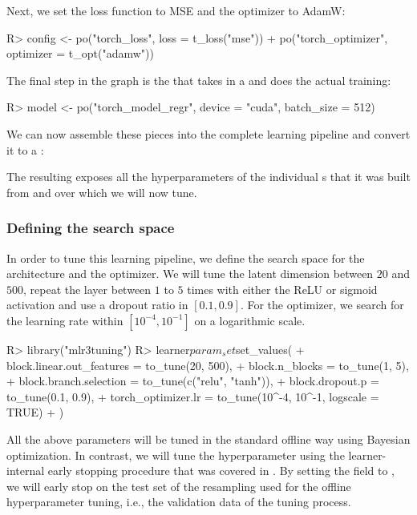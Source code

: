 \documentclass[article]{jss}
\theoremstyle{definition}
\begin{document}
Next, we set the loss function to MSE and the optimizer to AdamW:

\begin{CodeInput}
R> config <- po("torch_loss", loss = t_loss("mse")) %
+    po("torch_optimizer", optimizer = t_opt("adamw"))
\end{CodeInput}

The final step in the graph is the  that takes in a  and does the actual training:

\begin{CodeInput}
R> model <- po("torch_model_regr", device = "cuda", batch_size = 512)
\end{CodeInput}

We can now assemble these pieces into the complete learning pipeline and convert it to a :


The resulting  exposes all the hyperparameters of the individual s that it was built from and over which we will now tune.

\subsubsection{Defining the search space}
In order to tune this learning pipeline, we define the search space for the architecture and the optimizer.
We will tune the latent dimension between $20$ and $500$, repeat the layer between $1$ to $5$ times with either the ReLU or sigmoid activation and use a dropout ratio in $[0.1, 0.9]$.
For the optimizer, we search for the learning rate within $[10^{-4}, 10^{-1}]$ on a logarithmic scale.

\begin{CodeInput}
R> library("mlr3tuning")
R> learner$param_set$set_values(
+    block.linear.out_features = to_tune(20, 500),
+    block.n_blocks = to_tune(1, 5),
+    block.branch.selection = to_tune(c("relu", "tanh")),
+    block.dropout.p = to_tune(0.1, 0.9),
+    torch_optimizer.lr = to_tune(10^-4, 10^-1, logscale = TRUE)
+  )
\end{CodeInput}

All the above parameters will be tuned in the standard offline way using Bayesian optimization.
In contrast, we will tune the  hyperparameter using the learner-internal early stopping procedure that was covered in .
By setting the  field to , we will early stop on the test set of the resampling used for the offline hyperparameter tuning, i.e., the validation data of the tuning process.
\end{document}

